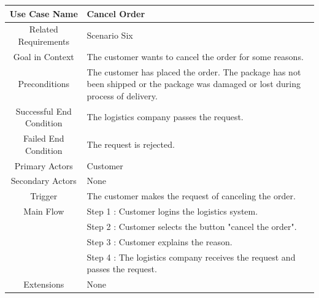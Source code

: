 \documentclass[12pt]{scrreprt}
\begin{document}
\begin{table}
  \centering
  \begin{tabular}{| c | p{11cm} |}
    \hline
    Use Case Name & Cancel Order\\
    \hline
    Related Requirements & Scenario Six\\
    \hline
    Goal in Context & The customer wants to cancel the order for some reasons.\\
    \hline
    Preconditions & The customer has placed the order. The package has not
    been shipped or the package was damaged or lost during process of delivery.\\
    \hline
    Successful End Condition & The logistics company passes the request.\\
    \hline
    Failed End Condition & The request is rejected.\\
    \hline
    Primary Actors & Customer\\
    \hline
    Secondary Actors & None\\
    \hline
    Trigger & The customer makes the request of canceling the order.\\
    \hline
    Main Flow & Step 1 : Customer logins the logistics system.\\
    & Step 2 : Customer selects the button "cancel the order".\\
    & Step 3 : Customer explains the reason.\\
    & Step 4 : The logistics company receives the request and passes the
    request.\\
    \hline
    Extensions & None\\
    \hline
  \end{tabular}
\end{table}
\end{document}
